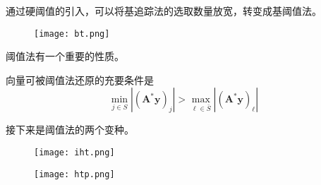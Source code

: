 通过硬阈值的引入，可以将基追踪法的选取数量放宽，转变成基阈值法。\par
\begin{figure}[!htbp]
    \centering
    \texttt{[image: bt.png]}
\end{figure}
阈值法有一个重要的性质。
\begin{proposition}
    向量可被阈值法还原的充要条件是
    \begin{equation}
        \min _{j \in S}\left|\left(\mathbf{A}^* \mathbf{y}\right)_j\right|>\max _{\ell \in \bar{S}}\left|\left(\mathbf{A}^* \mathbf{y}\right)_{\ell}\right|
    \end{equation}
\end{proposition}
接下来是阈值法的两个变种。
\begin{figure}[!htbp]
    \centering
    \texttt{[image: iht.png]}
\end{figure}
\begin{figure}[!htbp]
    \centering
    \texttt{[image: htp.png]}
\end{figure}
